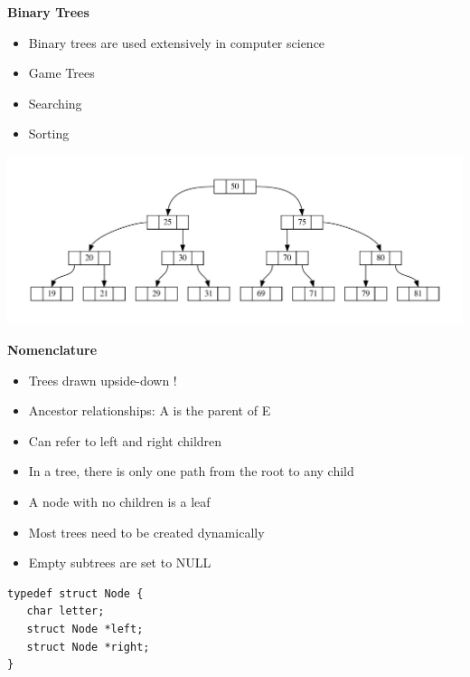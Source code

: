 \documentclass[a4,portraitt]{slides}
\begin{document}
\newpage
{\samepage
\begin{center}
{\Large{\bf Binary Trees}}
\end{center}
\begin{itemize}
\item Binary trees are used extensively in computer science
\item Game Trees
\item Searching
\item Sorting
\end{itemize}
\begin{center}
\includegraphics[width=\textwidth]{../Images/Linkedb.pdf}
\end{center}
}

\newpage
{\samepage
\begin{center}
{\Large{\bf Nomenclature}}
\end{center}
\begin{itemize}
\item Trees drawn upside-down !
\item Ancestor relationships: A is the parent of E
\item Can refer to left and right children
\item In a tree, there is only one path from the root to any child
\item A node with no children is a leaf
\item Most trees need to be created dynamically
\item Empty subtrees are set to NULL
\end{itemize}
\begin{verbatim}
typedef struct Node {
   char letter;
   struct Node *left;
   struct Node *right;
}
\end{verbatim}
}
\end{document}
